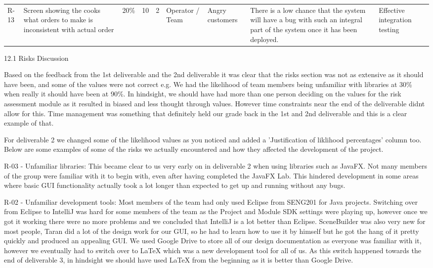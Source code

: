 \begin{table}
\begin{tabular}{lllllllll}
        R-13 & Screen showing the cooks what orders to make is inconsistent with actual order & 20\%                          & 10                            & 2                              & Operator / Team & Angry customers                            & There is a low chance that the system will have a bug with such an integral part of the system once it has been deployed. & Effective integration testing
    \end{tabular}
\end{table}


12.1 Risks Discussion

Based on the feedback from the 1st deliverable and the 2nd deliverable it was clear that the risks section was not as extensive as it should have been, and some of the values were not correct e.g. We had the likelihood of team members being unfamiliar with libraries at 30\% when really it should have been at 90\%. In hindsight, we should have had more than one person deciding on the values for the risk assessment module as it resulted in biased and less thought through values. However time constraints near the end of the deliverable didnt allow for this. Time management was something that definitely held our grade back in the 1st and 2nd deliverable and this is a clear example of that.

For deliverable 2 we changed some of the likelihood values as you noticed and added a 'Justification of liklihood percentages' column too. Below are some examples of some of the risks we actually encountered and how they affected the development of the project.

R-03 - Unfamiliar libraries: This became clear to us very early on in deliverable 2 when using libraries such as JavaFX. Not many members of the group were familiar with it to begin with, even after having completed the JavaFX Lab. This hindered development in some areas where basic GUI functionality actually took a lot longer than expected to get up and running without any bugs.

R-02 - Unfamiliar development tools: Most members of the team had only used Eclipse from SENG201 for Java projects. Switching over from Eclipse to IntelliJ was hard for some members of the team as the Project and Module SDK settings were playing up, however once we got it working there were no more problems and we concluded that IntelliJ is a lot better than Eclipse.
SceneBuilder was also very new for most people, Taran did a lot of the design work for our GUI, so he had to learn how to use it by himself but he got the hang of it pretty quickly and produced an appealing GUI.
We used Google Drive to store all of our design documentation as everyone was familiar with it, however we eventually had to switch over to LaTeX which was a new development tool for all of us. As this switch happened towards the end of deliverable 3, in hindsight we should have used LaTeX from the beginning as it is better than Google Drive.

